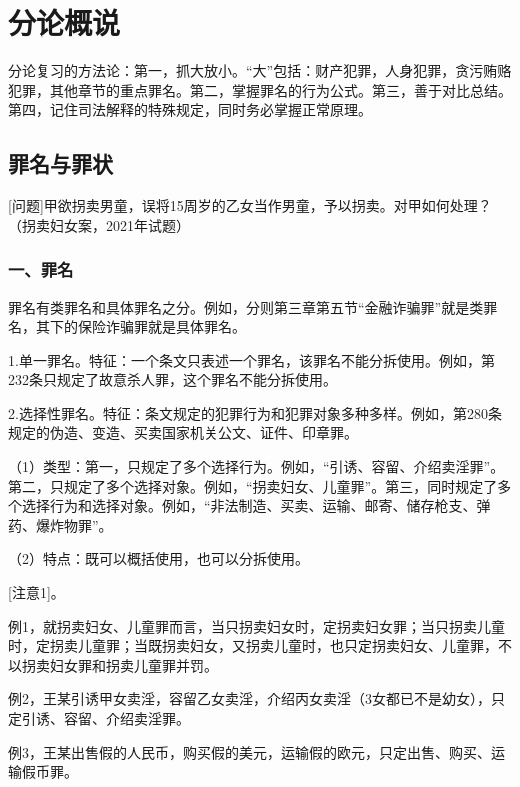 \chapter{分论概说}

\begin{EditionOpeningPanel}
分论复习的方法论：第一，抓大放小。“大”包括：财产犯罪，人身犯罪，贪污贿赂犯罪，其他章节的重点罪名。第二，掌握罪名的行为公式。第三，善于对比总结。第四，记住司法解释的特殊规定，同时务必掌握正常原理。
\end{EditionOpeningPanel}

\section{罪名与罪状}

[问题]甲欲拐卖男童，误将15周岁的乙女当作男童，予以拐卖。对甲如何处理？（拐卖妇女案，2021年试题）

\subsection*{一、罪名}

罪名有类罪名和具体罪名之分。例如，分则第三章第五节“金融诈骗罪”就是类罪名，其下的保险诈骗罪就是具体罪名。

1.单一罪名。特征：一个条文只表述一个罪名，该罪名不能分拆使用。例如，第232条只规定了故意杀人罪，这个罪名不能分拆使用。

2.选择性罪名。特征：条文规定的犯罪行为和犯罪对象多种多样。例如，第280条规定的伪造、变造、买卖国家机关公文、证件、印章罪。

（1）类型：第一，只规定了多个选择行为。例如，“引诱、容留、介绍卖淫罪”。第二，只规定了多个选择对象。例如，“拐卖妇女、儿童罪”。第三，同时规定了多个选择行为和选择对象。例如，“非法制造、买卖、运输、邮寄、储存枪支、弹药、爆炸物罪”。

（2）特点：既可以概括使用，也可以分拆使用。

[注意1]。

例1，就拐卖妇女、儿童罪而言，当只拐卖妇女时，定拐卖妇女罪；当只拐卖儿童时，定拐卖儿童罪；当既拐卖妇女，又拐卖儿童时，也只定拐卖妇女、儿童罪，不以拐卖妇女罪和拐卖儿童罪并罚。

例2，王某引诱甲女卖淫，容留乙女卖淫，介绍丙女卖淫（3女都已不是幼女），只定引诱、容留、介绍卖淫罪。

例3，王某出售假的人民币，购买假的美元，运输假的欧元，只定出售、购买、运输假币罪。

